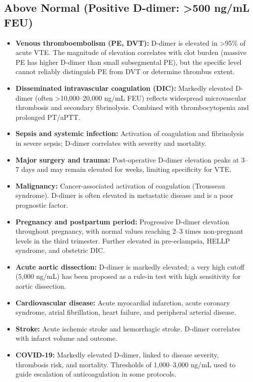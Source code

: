 \subsection*{Above Normal (Positive D-dimer: >500 ng/mL FEU)}
\begin{itemize}
  \item \textbf{Venous thromboembolism (PE, DVT):} D-dimer is elevated in >95\% of acute VTE. The magnitude of elevation correlates with clot burden (massive PE has higher D-dimer than small subsegmental PE), but the specific level cannot reliably distinguish PE from DVT or determine thrombus extent.
  \item \textbf{Disseminated intravascular coagulation (DIC):} Markedly elevated D-dimer (often >10,000--20,000 ng/mL FEU) reflects widespread microvascular thrombosis and secondary fibrinolysis. Combined with thrombocytopenia and prolonged PT/aPTT.
  \item \textbf{Sepsis and systemic infection:} Activation of coagulation and fibrinolysis in severe sepsis; D-dimer correlates with severity and mortality.
  \item \textbf{Major surgery and trauma:} Post-operative D-dimer elevation peaks at 3--7 days and may remain elevated for weeks, limiting specificity for VTE.
  \item \textbf{Malignancy:} Cancer-associated activation of coagulation (Trousseau syndrome). D-dimer is often elevated in metastatic disease and is a poor prognostic factor.
  \item \textbf{Pregnancy and postpartum period:} Progressive D-dimer elevation throughout pregnancy, with normal values reaching 2--3 times non-pregnant levels in the third trimester. Further elevated in pre-eclampsia, HELLP syndrome, and obstetric DIC.
  \item \textbf{Acute aortic dissection:} D-dimer is markedly elevated; a very high cutoff (5,000 ng/mL) has been proposed as a rule-in test with high sensitivity for aortic dissection.
  \item \textbf{Cardiovascular disease:} Acute myocardial infarction, acute coronary syndrome, atrial fibrillation, heart failure, and peripheral arterial disease.
  \item \textbf{Stroke:} Acute ischemic stroke and hemorrhagic stroke. D-dimer correlates with infarct volume and outcome.
  \item \textbf{COVID-19:} Markedly elevated D-dimer, linked to disease severity, thrombosis risk, and mortality. Thresholds of 1,000--3,000 ng/mL used to guide escalation of anticoagulation in some protocols.

\end{itemize}
